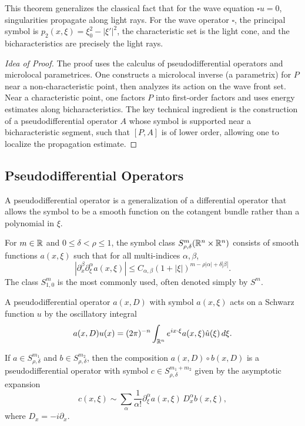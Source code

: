 This theorem generalizes the classical fact that for the wave equation
\(\square u = 0\), singularities propagate along light rays. For the
wave operator \(\square\), the principal symbol is
\(p_2(x,\xi) = \xi_0^2 - |\xi'|^2\), the characteristic set is the
light cone, and the bicharacteristics are precisely the light rays.

\begin{proof}[Idea of Proof]
The proof uses the calculus of pseudodifferential operators and
microlocal parametrices. One constructs a microlocal inverse (a
parametrix) for \(P\) near a non-characteristic point, then analyzes
its action on the wave front set. Near a characteristic point, one
factors \(P\) into first-order factors and uses energy estimates along
bicharacteristics. The key technical ingredient is the construction of
a pseudodifferential operator \(A\) whose symbol is supported near a
bicharacteristic segment, such that \([P, A]\) is of lower order,
allowing one to localize the propagation estimate.
\end{proof}

\subsection{Pseudodifferential Operators}

A pseudodifferential operator is a generalization of a differential
operator that allows the symbol to be a smooth function on the
cotangent bundle rather than a polynomial in \(\xi\).

\begin{definition}
For \(m \in \mathbb{R}\) and \(0 \leq \delta < \rho \leq 1\), the symbol class
\(S^m_{\rho,\delta}(\mathbb{R}^n \times \mathbb{R}^n)\) consists of smooth functions
\(a(x,\xi)\) such that for all multi-indices \(\alpha, \beta\),
\[
|\partial_x^\beta \partial_\xi^\alpha a(x,\xi)|
\leq C_{\alpha,\beta} (1+|\xi|)^{m - \rho|\alpha| + \delta|\beta|}.
\]
The class \(S^m_{1,0}\) is the most commonly used, often denoted simply
by \(S^m\).
\end{definition}

A pseudodifferential operator \(a(x,D)\) with symbol \(a(x,\xi)\) acts
on a Schwarz function \(u\) by the oscillatory integral
\[
a(x,D) u(x) = (2\pi)^{-n} \int_{\mathbb{R}^n} e^{i x \cdot \xi}
a(x,\xi) \hat u(\xi) \,d\xi.
\]

\begin{theorem}
If \(a \in S^{m_1}_{\rho,\delta}\) and \(b \in S^{m_2}_{\rho,\delta}\),
then the composition \(a(x,D) \circ b(x,D)\) is a pseudodifferential
operator with symbol \(c \in S^{m_1+m_2}_{\rho,\delta}\) given by the
asymptotic expansion
\[
c(x,\xi) \sim \sum_{\alpha} \frac{1}{\alpha!}
\partial_\xi^\alpha a(x,\xi) \, D_x^\alpha b(x,\xi),
\]
where \(D_x = -i\partial_x\).
\end{theorem}

